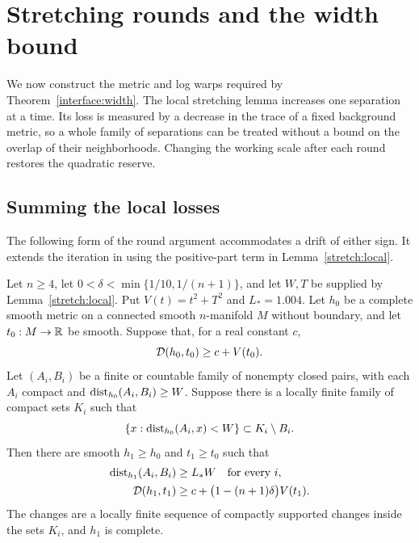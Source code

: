 \section{Stretching rounds and the width bound}\label{sec:assembly}
\label{assembly:section}

We now construct the metric and log warps required by
Theorem~\ref{interface:width}.  The local stretching lemma increases
one separation at a time.  Its loss is measured by a decrease in the
trace of a fixed background metric, so a whole family of separations
can be treated without a bound on the overlap of their neighborhoods.
Changing the working scale after each round restores the quadratic
reserve.

\subsection{Summing the local losses}

The following form of the round argument accommodates a drift of
either sign.  It extends the iteration in
\cite[Section~4]{OpenAIWidth} using the positive-part term in
Lemma~\ref{stretch:local}.

\begin{lemma}\label{assembly:round}
Let $n\ge4$, let
$0<\delta<\min\{1/10,1/(n+1)\}$, and let $W,T$ be supplied by
Lemma~\ref{stretch:local}.  Put $V(t)=t^2+T^2$ and $L_*=1.004$.
Let $h_0$ be a complete smooth metric on a connected smooth
$n$-manifold $M$ without boundary, and let $t_0:M\to\mathbb R$ be smooth.
Suppose that, for a real constant $c$,
\[
 \mathcal D(h_0,t_0)\ge c+V(t_0).
\]
Let $(A_i,B_i)$ be a finite or countable family of nonempty closed
pairs, with each $A_i$ compact and
$\operatorname{dist}_{h_0}(A_i,B_i)\ge W$.  Suppose there is a locally finite family
of compact sets $K_i$ such that
\[
 \{x:\operatorname{dist}_{h_0}(A_i,x)<W\}\subset K_i\setminus B_i.
\]
Then there are smooth $h_1\ge h_0$ and $t_1\ge t_0$ such that
\begin{align}
 \operatorname{dist}_{h_1}(A_i,B_i)&\ge L_*W\quad\hbox{for every }i,
       \label{assembly:round-distance}\\
 \mathcal D(h_1,t_1)&\ge c+\bigl(1-(n+1)\delta\bigr)V(t_1).
       \label{assembly:round-reserve}
\end{align}
The changes are a locally finite sequence of compactly supported
changes inside the sets $K_i$, and $h_1$ is complete.
\end{lemma}

